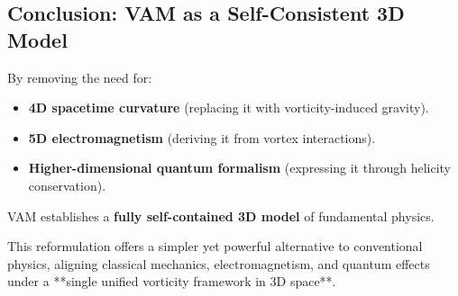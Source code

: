 \subsection{Conclusion: VAM as a Self-Consistent 3D Model}
By removing the need for:
\begin{itemize}
    \item \textbf{4D spacetime curvature} (replacing it with vorticity-induced gravity).
    \item \textbf{5D electromagnetism} (deriving it from vortex interactions).
    \item \textbf{Higher-dimensional quantum formalism} (expressing it through helicity conservation).
\end{itemize}
VAM establishes a \textbf{fully self-contained 3D model} of fundamental physics.

This reformulation offers a simpler yet powerful alternative to conventional physics, aligning classical mechanics, electromagnetism, and quantum effects under a **single unified vorticity framework in 3D space**.

